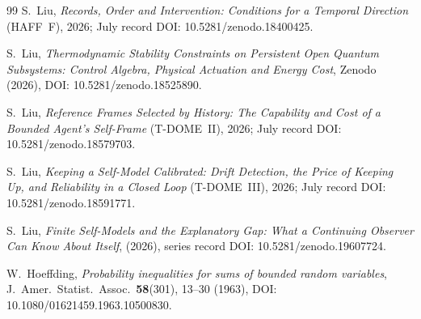 \documentclass[12pt]{article}
\begin{document}
\begin{thebibliography}{99}
S.~Liu, \emph{Records, Order and Intervention: Conditions for a Temporal Direction} (HAFF~F), 2026; July record DOI: 10.5281/zenodo.18400425.

S.~Liu, \emph{Thermodynamic Stability Constraints on Persistent Open Quantum Subsystems: Control Algebra, Physical Actuation and Energy Cost}, Zenodo (2026), DOI: 10.5281/zenodo.18525890.

S.~Liu, \emph{Reference Frames Selected by History: The Capability and Cost of a Bounded Agent's Self-Frame} (T-DOME~II), 2026; July record DOI: 10.5281/zenodo.18579703.

S.~Liu, \emph{Keeping a Self-Model Calibrated: Drift Detection, the Price of Keeping Up, and Reliability in a Closed Loop} (T-DOME~III), 2026; July record DOI: 10.5281/zenodo.18591771.

S.~Liu, \emph{Finite Self-Models and the Explanatory Gap: What a Continuing Observer Can Know About Itself}, (2026), series record DOI: 10.5281/zenodo.19607724.

W.~Hoeffding,
\emph{Probability inequalities for sums of bounded random variables},
J.~Amer.~Statist.~Assoc.~\textbf{58}(301), 13--30 (1963),
DOI: 10.1080/01621459.1963.10500830.

\end{thebibliography}
\end{document}
